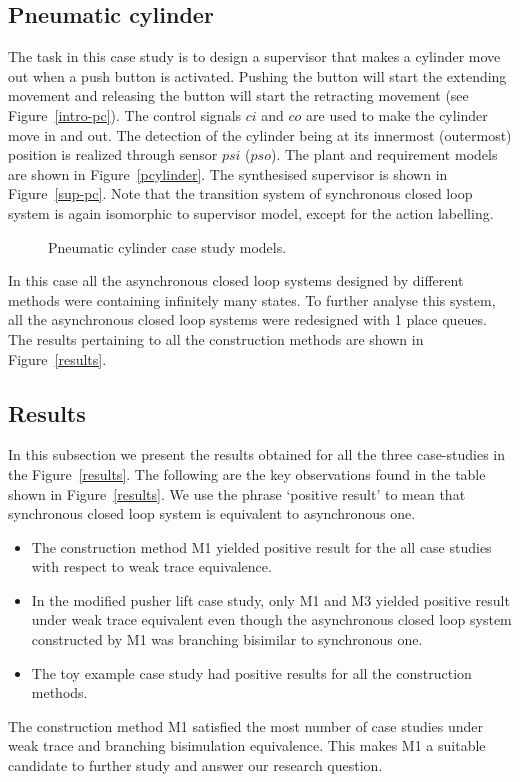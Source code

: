 \documentclass[a4paper,english,final]{article}
\theoremstyle{plain}
\theoremstyle{definition}
\begin{document}
\subsection{Pneumatic cylinder \cite{4k460}}\label{subsec-pc}
The task in this case study is to design a supervisor that makes a cylinder move out when a push button is activated.
Pushing the button will start the extending movement and releasing the button will start the retracting movement (see Figure~\ref{intro-pc}). The control signals $ci$ and $co$ are used to make the cylinder move in and out. The detection of the cylinder being at its innermost (outermost) position is realized through sensor $psi$ ($pso$). The plant and requirement models are shown in Figure~\ref{pcylinder}. The synthesised supervisor is shown in Figure~\ref{sup-pc}. Note that the transition system of synchronous closed loop system is again isomorphic to supervisor model, except for the action labelling.

\begin{figure}
\hspace{1cm}
\caption{Pneumatic cylinder case study models.}\label{pneumatic}
\end{figure}

In this case all the asynchronous closed loop systems designed by different methods were containing infinitely many states. To further analyse this system, all the asynchronous closed loop systems were redesigned with 1 place queues. The results pertaining to all the construction methods are shown in Figure~\ref{results}.

\subsection{Results}\label{subsec-results}
In this subsection we present the results obtained for all the three case-studies in the Figure~\ref{results}. The following are the key observations found in the table shown in Figure~\ref{results}. We use the phrase `positive result' to mean that synchronous closed loop system is equivalent to asynchronous one.
\begin{itemize}
\item The construction method M1 yielded positive result for the all case studies with respect to weak trace equivalence.
\item In the modified pusher lift case study, only M1 and M3 yielded positive result under weak trace equivalent even though the asynchronous closed loop system constructed by M1 was branching bisimilar to synchronous one.
\item The toy example case study had positive results for all the construction methods.
\end{itemize}
The construction method M1 satisfied the most number of case studies under weak trace and branching bisimulation equivalence. This makes M1 a suitable candidate to further study and answer our research question.
\end{document}
